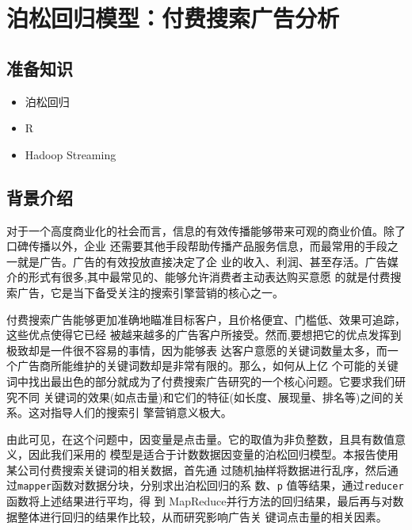 \section{泊松回归模型：付费搜索广告分析}\label{ux5b9eux4f8bux5206ux6790ux5bf9ux4ed8ux8d39ux641cux7d22ux5e7fux544aux7684ux6ccaux677eux56deux5f52}

\subsection{准备知识}\label{ux51c6ux5907ux77e5ux8bc6}

\begin{itemize}
\itemsep1pt\parskip0pt
\item
  泊松回归
\item
  R
\item
  Hadoop Streaming
\end{itemize}

\subsection{背景介绍}\label{ux80ccux666fux4ecbux7ecd}

对于一个高度商业化的社会而言，信息的有效传播能够带来可观的商业价值。除了口碑传播以外，企业
还需要其他手段帮助传播产品服务信息，而最常用的手段之一就是广告。广告的有效投放直接决定了企
业的收入、利润、甚至存活。广告媒介的形式有很多,其中最常见的、能够允许消费者主动表达购买意愿
的就是付费搜索广告，它是当下备受关注的搜索引擎营销的核心之一。

付费搜索广告能够更加准确地瞄准目标客户，且价格便宜、门槛低、效果可追踪，这些优点使得它已经
被越来越多的广告客户所接受。然而,要想把它的优点发挥到极致却是一件很不容易的事情，因为能够表
达客户意愿的关键词数量太多，而一个广告商所能维护的关键词数却是非常有限的。那么，如何从上亿
个可能的关键词中找出最出色的部分就成为了付费搜索广告研究的一个核心问题。它要求我们研究不同
关键词的效果(如点击量)和它们的特征(如长度、展现量、排名等)之间的关系。这对指导人们的搜索引
擎营销意义极大。

由此可见，在这个问题中，因变量是点击量。它的取值为非负整数，且具有数值意义，因此我们采用的
模型是适合于计数数据因变量的泊松回归模型。本报告使用某公司付费搜索关键词的相关数据，首先通
过随机抽样将数据进行乱序，然后通过\lstinline!mapper!函数对数据分块，分别求出泊松回归的系
数、\lstinline!p! 值等结果，通过\lstinline!reducer! 函数将上述结果进行平均，得
到 MapReduce并行方法的回归结果，最后再与对数据整体进行回归的结果作比较，从而研究影响广告关
键词点击量的相关因素。

